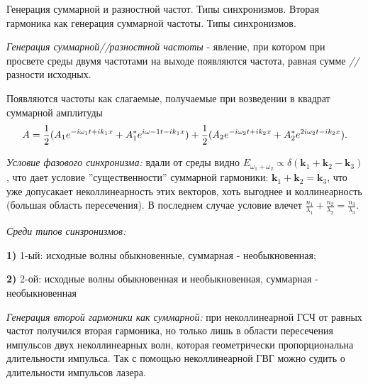 
\begin{leftrules}
Генерация суммарной и разностной частот. Типы синхронизмов. Вторая гармоника как генерация суммарной частоты. Типы синхронизмов. 
\end{leftrules}





\begin{to_def}
    \textit{Генерация суммарной//разностной частоты} - явление, при котором при просвете среды двумя частотами на выходе появляются частота, равная сумме \textit{//} разности исходных.
\end{to_def}

Появляются частоты как слагаемые, получаемые при возведении в квадрат суммарной амплитуды
\begin{equation*}
    A = \frac{1}{2} (A_{1}e^{-i\omega_{1} t +i k_{1}x} + A^*_{1}e^{i\omega-1 t -i k_1 x}) + \\ \frac{1}{2} (A_{2}e^{-i\omega_{2} t +i k_{2}x} + A^*_{2}e^{2i\omega_{2} t -i k_{2}x}).
\end{equation*}


\textit{Условие фазового синхронизма:} вдали от среды видно $E_{\omega_{1}+\omega_{2}} \propto \delta(\mathbf{k}_{1}+\mathbf{k}_{2}-\mathbf{k}_{3})$, что дает условие ''существенности'' суммарной гармоники: $\mathbf{k}_{1}+\mathbf{k}_{2}=\mathbf{k}_{3}$, что уже допусакает неколлинеарность этих векторов, хоть выгоднее и коллинеарность (большая область пересечения). В последнем случае условие влечет $\frac{n_{1}}{\lambda_{1}}+\frac{n_{2}}{\lambda_{2}}=\frac{n_{3}}{\lambda_{3}}$.


\textit{Среди типов синзронизмов:} \\
    \par \textbf{1)} 1-ый: исходные волны обыкновенные, суммарная - необыкновенная;\\
    \par \textbf{2)} 2-ой: исходные волны обыкновенная и необыкновенная, суммарная - необыкновенная


\textit{Генерация второй гармоники как суммарной:} при неколлинеарной ГСЧ от равных частот получился вторая гармоника, но только лишь в области пересечения импульсов двух неколлинеарных волн, которая геометрически пропорциональна длительности импульса. Так с помощью неколлинеарной ГВГ можно судить о длительности импульсов лазера.